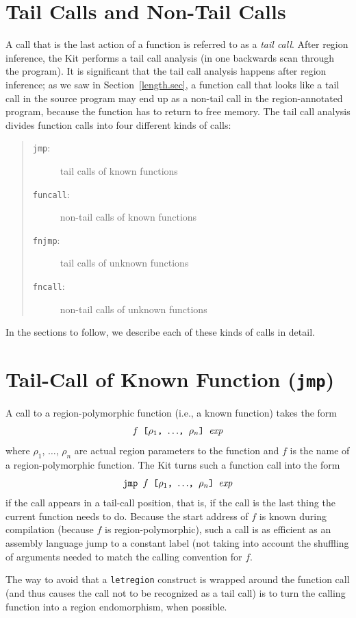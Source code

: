 \documentclass[12pt]{book}
\begin{document}
\section{Tail Calls and Non-Tail Calls}
\label{tailcall.sec}
A call that is the last action of a function is referred to as a {\em
  tail call}. After region inference, the Kit performs a tail call
analysis (in one backwards scan through the program). It is
significant that the tail call analysis happens after region
inference; as we saw in Section~\ref{length.sec}, a function call that
looks like a tail call in the source program may end up as a non-tail
call in the region-annotated program, because the function has to
return to free memory. The tail call analysis divides function calls
into four different kinds of calls:
\begin{quote}
\begin{description}
\item[{\tt jmp}:] tail calls of known functions
\item[{\tt funcall}:] non-tail calls of known functions
\item[{\tt fnjmp}:] tail calls of unknown functions
\item[{\tt fncall}:] non-tail calls of unknown functions
\end{description}
\end{quote}
In the sections to follow, we describe each of these kinds of calls in
detail.

\section{Tail-Call of Known Function ({\tt jmp})}
\label{simplejump.sec}
A call to a
%
region-polymorphic function (i.e., a known function) takes the form
$$\hbox{\tt $f$ [$\rho_1$, $\ldots$, $\rho_n$] $\hbox{\it exp}$}$$
where $\rho_1$,
$\ldots$, $\rho_n$ are actual region parameters to the function and $f$
is the name of a region-polymorphic function. The Kit turns such a
function call into the form
$$\hbox{\tt jmp $f$ [$\rho_1$, $\ldots$, $\rho_n$] $\hbox{\it exp}$}$$
if the call
appears in a tail-call position, that is, if the call is the last
thing the current function needs to do.  Because the start address of
$f$ is known during compilation (because $f$ is region-polymorphic),
such a call is as efficient as an assembly language jump to a constant
label (not taking into account the shuffling of arguments needed to
match the calling convention for $f$.

The way to avoid that a {\tt letregion} construct is wrapped around
the function call (and thus causes the call not to be recognized as a
tail call) is to turn the calling function into a region endomorphism,
when possible.
\end{document}
